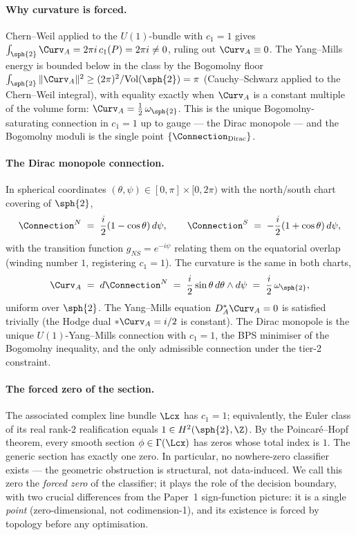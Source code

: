 \paragraph{Why curvature is forced.} Chern--Weil applied to the
$U(1)$-bundle with $c_1=1$ gives
$\int_{\sph{2}}\Curv_A = 2\pi i\,c_1(P) = 2\pi i \neq 0$,
ruling out $\Curv_A\equiv 0$. The Yang--Mills energy is bounded
below in the class by the Bogomolny floor
$\int_{\sph{2}}\|\Curv_A\|^2\geq (2\pi)^2/\mathrm{Vol}(\sph{2})=\pi$
(Cauchy--Schwarz applied to the Chern--Weil integral), with equality
exactly when $\Curv_A$ is a constant multiple of the volume form:
$\Curv_A=\tfrac{1}{2}\,\omega_{\sph{2}}$. This is the unique
Bogomolny-saturating connection in $c_1=1$ up to gauge --- the Dirac
monopole --- and the Bogomolny moduli is the single point
$\{\Connection_{\mathrm{Dirac}}\}$.

\paragraph{The Dirac monopole connection.} In spherical coordinates
$(\theta,\psi)\in[0,\pi]\times[0,2\pi)$ with the north/south chart
covering of $\sph{2}$,
\[
   \Connection^{N} \;=\; \frac{i}{2}(1-\cos\theta)\,d\psi,
   \qquad
   \Connection^{S} \;=\; -\frac{i}{2}(1+\cos\theta)\,d\psi,
\]
with the transition function $g_{NS}=e^{-i\psi}$ relating them on
the equatorial overlap (winding number $1$, registering
$c_1=1$). The curvature is the same in both charts,
\[
   \Curv_A \;=\; d\Connection^{N} \;=\; \frac{i}{2}\sin\theta\,
   d\theta\wedge d\psi \;=\; \frac{i}{2}\,\omega_{\sph{2}},
\]
uniform over $\sph{2}$. The Yang--Mills equation $D_A^*\Curv_A=0$ is
satisfied trivially (the Hodge dual $*\Curv_A=i/2$ is constant). The
Dirac monopole is the unique $U(1)$-Yang--Mills connection with
$c_1=1$, the BPS minimiser of the Bogomolny inequality, and the only
admissible connection under the tier-2 constraint.

\paragraph{The forced zero of the section.} The associated complex
line bundle $\Lcx$ has $c_1=1$; equivalently, the Euler class of its
real rank-$2$ realification equals $1\in H^2(\sph{2},\Z)$. By the
Poincar\'e--Hopf theorem, every smooth section
$\phi\in\Gamma(\Lcx)$ has zeros whose total index is $1$. The
generic section has exactly one zero. In particular, no nowhere-zero
classifier exists --- the geometric obstruction is structural, not
data-induced. We call this zero the \emph{forced zero} of the
classifier; it plays the role of the decision boundary, with two
crucial differences from the Paper~1 sign-function picture: it is a
single \emph{point} (zero-dimensional, not codimension-1), and its
existence is forced by topology before any optimisation.

